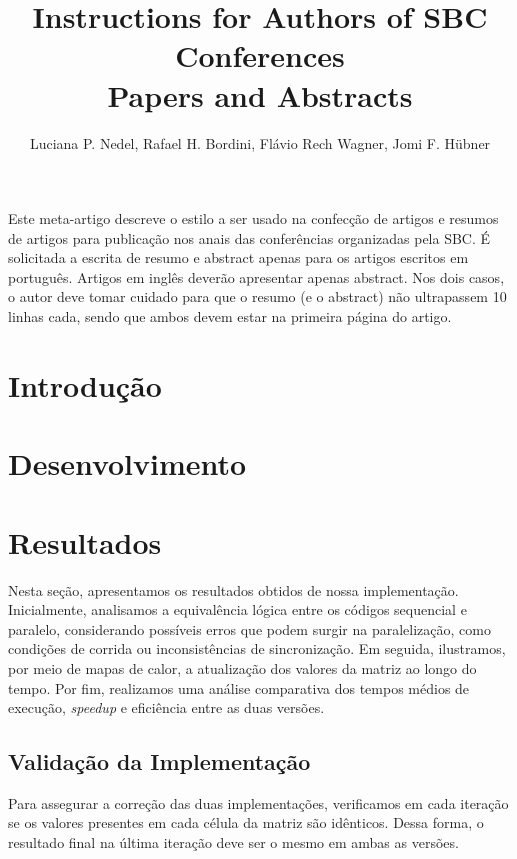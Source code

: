 \documentclass[12pt]{article}
\title{Instructions for Authors of SBC Conferences\\ Papers and Abstracts}
\author{Luciana P. Nedel\inst{1}, Rafael H. Bordini\inst{2}, Flávio Rech
  Wagner\inst{1}, Jomi F. Hübner\inst{3} }
\begin{document}
 

\maketitle
     
\begin{resumo} 
  Este meta-artigo descreve o estilo a ser usado na confecção de artigos e
  resumos de artigos para publicação nos anais das conferências organizadas
  pela SBC. É solicitada a escrita de resumo e abstract apenas para os artigos
  escritos em português. Artigos em inglês deverão apresentar apenas abstract.
  Nos dois casos, o autor deve tomar cuidado para que o resumo (e o abstract)
  não ultrapassem 10 linhas cada, sendo que ambos devem estar na primeira
  página do artigo.
\end{resumo}

\section{Introdução}

\section{Desenvolvimento}

\section{Resultados}

Nesta seção, apresentamos os resultados obtidos de nossa implementação. Inicialmente, analisamos a equivalência lógica entre os códigos sequencial e paralelo, considerando possíveis erros que podem surgir na paralelização, como condições de corrida ou inconsistências de sincronização. Em seguida, ilustramos, por meio de mapas de calor, a atualização dos valores da matriz ao longo do tempo. Por fim, realizamos uma análise comparativa dos tempos médios de execução, \textit{speedup} e eficiência entre as duas versões.

\subsection{Validação da Implementação}

Para assegurar a correção das duas implementações, verificamos em cada iteração se os valores presentes em cada célula da matriz são idênticos. Dessa forma, o resultado final na última iteração deve ser o mesmo em ambas as versões.
\end{document}
